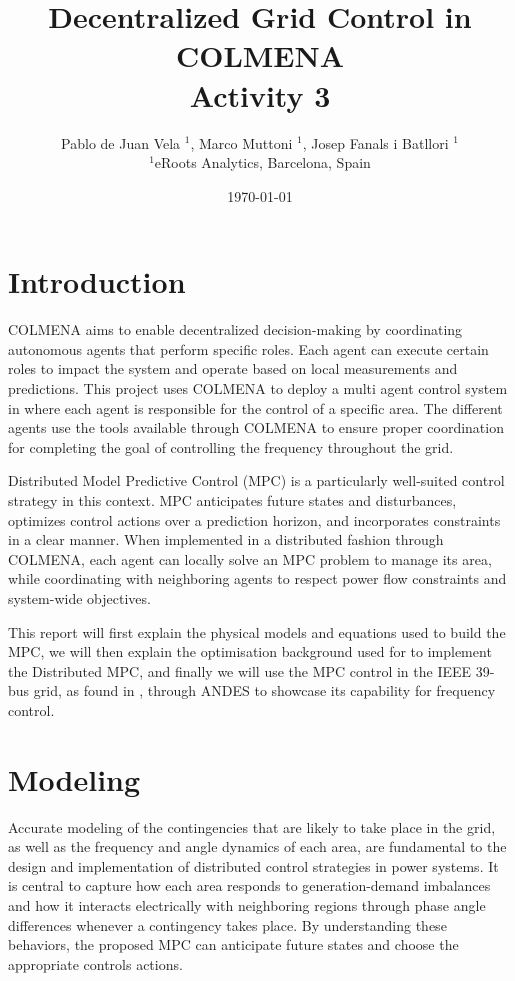 \documentclass{article}
\title{Decentralized Grid Control in COLMENA \\ Activity 3}
\author{Pablo de Juan Vela $^{1}$, Marco Muttoni $^{1}$, Josep Fanals i Batllori $^{1}$ \\
        \small $^{1}$eRoots Analytics, Barcelona, Spain \\
}
\date{\today}
\begin{document}
\maketitle
\section{Introduction}
COLMENA aims to enable decentralized decision-making by coordinating autonomous agents that perform specific roles. Each agent can execute certain roles to impact the system and operate based on local measurements and predictions. This project uses COLMENA to deploy a multi agent control system in where each agent is responsible for the control of a specific area. The different agents use the tools available through COLMENA to ensure proper coordination for completing the goal of controlling the frequency throughout the grid.

Distributed Model Predictive Control (MPC) is a particularly well-suited control strategy in this context. MPC anticipates future states and disturbances, optimizes control actions over a prediction horizon, and incorporates constraints in a clear manner. When implemented in a distributed fashion through COLMENA, each agent can locally solve an MPC problem to manage its area, while coordinating with neighboring agents to respect power flow constraints and system-wide objectives.

This report will first explain the physical models and equations used to build the MPC, we will then explain the optimisation background used for to implement the Distributed MPC, and finally we will use the MPC control in the IEEE 39-bus grid, as found in \cite{grids:ieee39}, through ANDES to showcase its capability for frequency control.

\newpage
\section{Modeling}
Accurate modeling of the contingencies that are likely to take place in the grid, as well as the frequency and angle dynamics of each area, are fundamental to the design and implementation of distributed control strategies in power systems. It is central to capture how each area responds to generation-demand imbalances and how it interacts electrically with neighboring regions through phase angle differences whenever a contingency takes place. By understanding these behaviors, the proposed MPC can anticipate future states and choose the appropriate controls actions.
\end{document}
